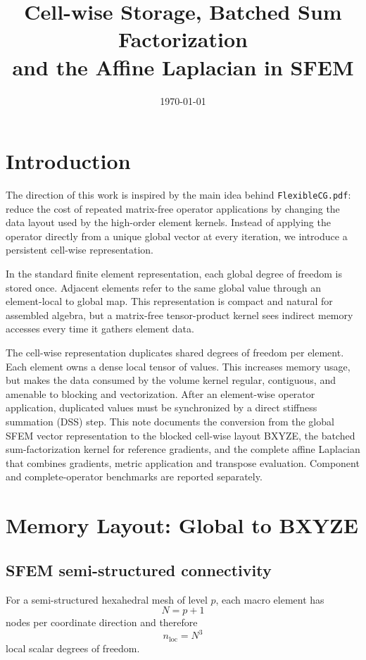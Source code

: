 \documentclass[11pt]{article}
\title{Cell-wise Storage, Batched Sum Factorization\\
and the Affine Laplacian in SFEM}
\author{}
\date{\today}
\begin{document}
\maketitle

\section{Introduction}

The direction of this work is inspired by the main idea behind
\texttt{FlexibleCG.pdf}: reduce the cost of repeated matrix-free operator
applications by changing the data layout used by the high-order element kernels.
Instead of applying the operator directly from a unique global vector at every
iteration, we introduce a persistent cell-wise representation.

In the standard finite element representation, each global degree of freedom is
stored once. Adjacent elements refer to the same global value through an
element-local to global map. This representation is compact and natural for
assembled algebra, but a matrix-free tensor-product kernel sees indirect memory
accesses every time it gathers element data.

The cell-wise representation duplicates shared degrees of freedom per element.
Each element owns a dense local tensor of values. This increases memory usage,
but makes the data consumed by the volume kernel regular, contiguous, and
amenable to blocking and vectorization. After an element-wise operator
application, duplicated values must be synchronized by a direct stiffness
summation (DSS) step. This note documents the conversion from the global SFEM
vector representation to the blocked cell-wise layout BXYZE, the batched
sum-factorization kernel for reference gradients, and the complete affine
Laplacian that combines gradients, metric application and transpose evaluation.
Component and complete-operator benchmarks are reported separately.

\section{Memory Layout: Global to BXYZE}

\subsection{SFEM semi-structured connectivity}

For a semi-structured hexahedral mesh of level \(p\), each macro element has
\[
    N = p + 1
\]
nodes per coordinate direction and therefore
\[
    n_{\mathrm{loc}} = N^3
\]
local scalar degrees of freedom.
\end{document}

